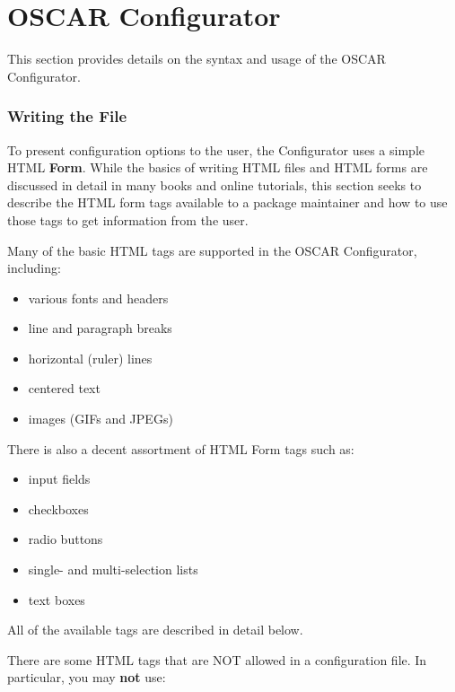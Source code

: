 %
%


\section{OSCAR Configurator}
\label{sect:configurator}

This section provides details on the syntax and usage of the OSCAR
Configurator. 

\subsubsection*{Writing the  File}

To present configuration options to the user, the Configurator uses
a simple HTML \textbf{Form}. While the basics of writing HTML files
and HTML forms are discussed in detail in many books and online tutorials,
this section seeks to describe the HTML form tags available to a package
maintainer and how to use those tags to get information from the user.

Many of the basic HTML tags are supported in the OSCAR Configurator,
including:

\begin{itemize}
\item various fonts and headers 
\item line and paragraph breaks 
\item horizontal (ruler) lines 
\item centered text 
\item images (GIFs and JPEGs) 
\end{itemize}
There is also a decent assortment of HTML Form tags such as:

\begin{itemize}
\item input fields
\item checkboxes
\item radio buttons
\item single- and multi-selection lists
\item text boxes 
\end{itemize}
All of the available tags are described in detail below.

There are some HTML tags that are NOT allowed in a configuration file.
In particular, you may \textbf{not} use:

